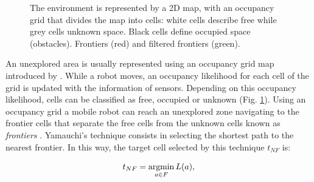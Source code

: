 \begin{figure}[t!]
	\centering
	\caption {The environment is represented by a 2D map, with an occupancy grid that divides the map into cells: white cells describe free while grey cells unknown space. Black cells define occupied space (obstacles). Frontiers (red) and filtered frontiers (green).}
	\label{fig:environment}
\end{figure}
An unexplored area is usually represented using an occupancy grid map introduced by \cite{Moravec}. While a robot moves, an occupancy likelihood for each cell of the grid is updated with the information of sensors. Depending on this occupancy likelihood, cells can be classified as free, occupied or unknown (Fig. \ref{fig:environment}). Using an occupancy grid a mobile robot can reach an unexplored zone navigating to the frontier cells that separate the free cells from the unknown cells known as \textit{frontiers} \cite{Yamauchi1997}. Yamauchi's technique consists in selecting the shortest path to the nearest frontier. In this way, the target cell selected by this technique $t_{NF}$ is:

\begin{equation}
t_{NF} = \operatorname*{argmin}_{a \in F} L(a), 
\label{equation:t-nf}
\end{equation}

